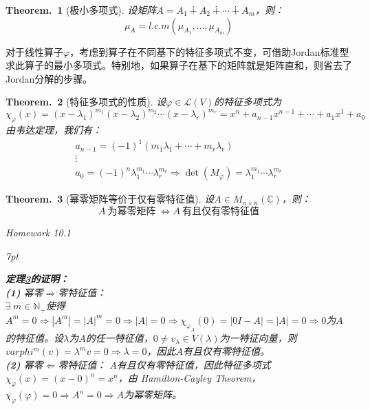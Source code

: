 \documentclass[zihao=-4,UTF8]{report}
\theoremstyle{mystyle} %
\newtheorem{theorem}{Theorem.\,}
\newenvironment{graybox}{%
\def\FrameCommand{%
\hspace{1pt}%
{\color{gray}\small \vrule width 2pt}%
{\color{graybox_color}\vrule width 4pt}%
\colorbox{graybox_color}%
}%
\MakeFramed{\advance\hsize-\width\FrameRestore}%
\noindent\hspace{-4.55pt}%
\begin{adjustwidth}{}{7pt}%
\vspace{2pt}\vspace{2pt}%
}
{%
\vspace{2pt}\end{adjustwidth}\endMakeFramed%
}
\begin{document}
\begin{theorem}[极小多项式]\label{极小多项式}
设矩阵$A = A_1 \dotplus A_2 \dotplus \cdots \dotplus A_m$，则：
\begin{equation*}
    \mu_A = l.c.m(\mu_{A_1},...,\mu_{A_m})
\end{equation*}
\end{theorem}
{\par\color{gray}\small
对于线性算子$\varphi$，考虑到算子在不同基下的特征多项式不变，可借助Jordan标准型求此算子的最小多项式。特别地，如果算子在基下的矩阵就是矩阵直和，则省去了Jordan分解的步骤。
\par}
\begin{theorem}[特征多项式的性质]\label{特征多项式的性质}
设$\varphi \in \mathscr{L}(V)$的特征多项式为
\begin{equation*}
    \chi_{\varphi}(x) = (x-\lambda_1)^{m_1}(x-\lambda_2)^{m_2} \cdots (x-\lambda_r)^{m_r} = x^n + a_{n-1}x^{n-1} + \cdots + a_1x^1 + a_0    
\end{equation*}
由韦达定理，我们有：
\begin{gather*}
    a_{n-1} = (-1)^1\left(m_1\lambda_1 + \cdots + m_r\lambda_r \right)\\
    \vdots \\
    a_0 = (-1)^n \lambda_1^{m_1}\cdots\lambda_r^{m_r}\Longrightarrow \det(M_{\varphi}) =  \lambda_1^{m_1}\cdots\lambda_r^{m_r}
\end{gather*}
\end{theorem}

\begin{theorem}[幂零矩阵等价于仅有零特征值]\label{幂零矩阵仅有零特征值}
设$A \in M_{n\times n}(\mathbb{C})$，则：
\begin{equation*}
    A\ \text{为幂零矩阵}\ \Longleftrightarrow A\ \text{有且仅有零特征值}
\end{equation*}
{\par\color{gray}\small
Homework 10.1 
\par}

\begin{graybox}
\textbf{定理\ref{幂零矩阵仅有零特征值}的证明：}\\
\textbf{(1) }幂零$\Longrightarrow$零特征值：\\
$\exists\ m \in \mathbb{N}_+$使得$A^m = 0 \Longrightarrow |A^m| = |A|^m = 0 \Longrightarrow |A| = 0 \Longrightarrow \chi_{\varphi_A}(0) = |0I - A| = |A| = 0 \Longrightarrow 0$为$A$的特征值。设$\lambda$为$A$的任一特征值，$0 \ne v_{\lambda} \in V(\lambda)$为一特征向量，则$varphi^m(v) = \lambda^m v = 0 \Longrightarrow \lambda = 0$，因此$A$有且仅有零特征值。\\
\textbf{(2) }幂零$\Longleftarrow$零特征值：
$A$有且仅有零特征值，因此特征多项式$\chi_{\varphi}(x) = (x-0)^n = x^n$，由 Hamilton-Cayley Theorem，$\chi_{\varphi}(\varphi) = 0 \Longrightarrow A^n = 0 \Longrightarrow A$为幂零矩阵。
\end{graybox}
\end{theorem}
\end{document}
